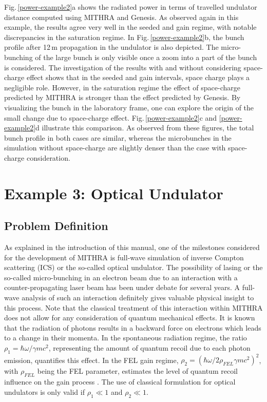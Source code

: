Fig.\,\ref{power-example2}a shows the radiated power in terms of travelled undulator distance computed using MITHRA and Genesis.
%
As observed again in this example, the results agree very well in the seeded and gain regime, with notable discrepancies in the saturation regime.
%
In Fig.\,\ref{power-example2}b, the bunch profile after 12\,m propagation in the undulator is also depicted.
%
The micro-bunching of the large bunch is only visible once a zoom into a part of the bunch is considered.
%
The investigation of the results with and without considering space-charge effect shows that in the seeded and gain intervals, space charge plays a negligible role.
%
However, in the saturation regime the effect of space-charge predicted by MITHRA is stronger than the effect predicted by Genesis.
%
By visualizing the bunch in the laboratory frame, one can explore the origin of the small change due to space-charge effect.
%
Fig.\,\ref{power-example2}c and \ref{power-example2}d illustrate this comparison.
%
As observed from these figures, the total bunch profile in both cases are similar, whereas the microbunches in the simulation without space-charge are slightly denser than the case with space-charge consideration.

\section{Example 3: Optical Undulator}

\subsection{Problem Definition}

As explained in the introduction of this manual, one of the milestones considered for the development of MITHRA is full-wave simulation of inverse Compton scattering (ICS) or the so-called optical undulator.
%
The possibility of lasing or the so-called micro-bunching in an electron beam due to an interaction with a counter-propagating laser beam has been under debate for several years.
%
A full-wave analysis of such an interaction definitely gives valuable physical insight to this process.
%
Note that the classical treatment of this interaction within MITHRA does not allow for any consideration of quantum mechanical effects.
%
It is known that the radiation of photons results in a backward force on electrons which leads to a change in their momenta.
%
In the spontaneous radiation regime, the ratio $\rho_1 = \hbar\omega/\gamma mc^2$, representing the amount of quantum recoil due to each photon emission, quantifies this effect.
%
In the FEL gain regime, $\rho_2 = (\hbar\omega/2 \rho_{FEL} \gamma mc^2)^2$, with $\rho_{FEL}$ being the FEL parameter, estimates the level of quantum recoil influence on the gain process \cite{bonifacio2006quantum,bonifacio2005quantum}.
%
The use of classical formulation for optical undulators is only valid if $\rho_1 \ll 1$ and $\rho_2 \ll 1$.

